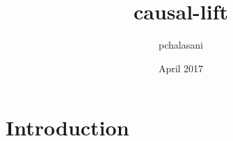 \documentclass{article}
\title{causal-lift}
\author{pchalasani }
\date{April 2017}
\begin{document}
\maketitle

\section{Introduction}
\end{document}
